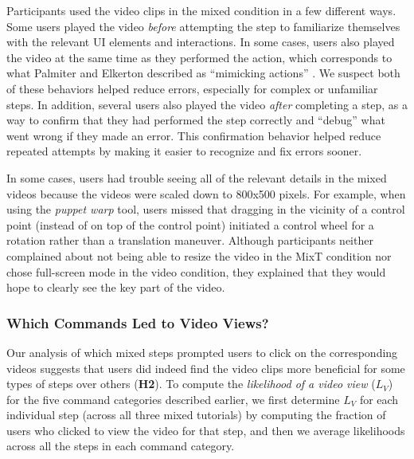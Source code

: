 Participants used the video clips in the mixed condition in a few different ways. Some users played the video \emph{before} attempting the step to familiarize themselves with the relevant UI elements and interactions. In some cases, users also played the video at the same time as they performed the action, which corresponds to what Palmiter and Elkerton described as ``mimicking actions'' \cite{Palmiter:1991:ADV:107792.107797}. We suspect both of these behaviors helped reduce errors, especially for complex or unfamiliar steps. In addition, several users also played the video \emph{after} completing a step, as a way to confirm that they had performed the step correctly and “debug” what went wrong if they made an error. This confirmation behavior helped reduce repeated attempts by making it easier to recognize and fix errors sooner.

In some cases, users had trouble seeing all of the relevant details in the mixed videos because the videos were scaled down to 800x500 pixels. For example, when using the \emph{puppet warp} tool, users missed that dragging in the vicinity of a control point (instead of on top of the control point) initiated a control wheel for a rotation rather than a translation maneuver. Although participants neither complained about not being able to resize the video in the MixT condition nor chose full-screen mode in the video condition, they explained that they would hope to clearly see the key part of the video.

\subsubsection{Which Commands Led to Video Views?}
Our analysis of which mixed steps prompted users to click on the corresponding videos suggests that users did indeed find the video clips more beneficial for some types of steps over others (\textbf{H2}). To compute the \emph{likelihood of a video view} ($L_V$) for the five command categories described earlier, we first determine $L_V$ for each individual step (across all three mixed tutorials) by computing the fraction of users who clicked to view the video for that step, and then we average likelihoods across all the steps in each command category.

